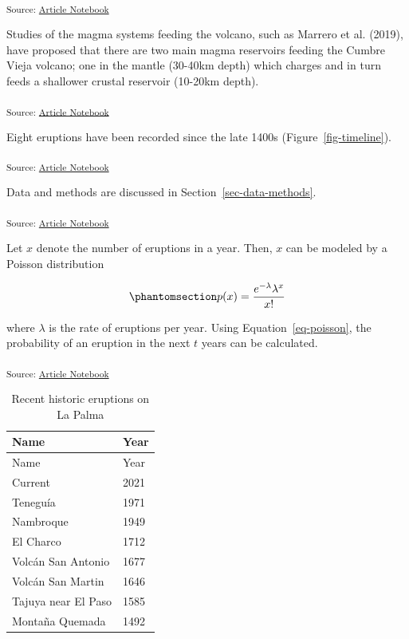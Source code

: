 \documentclass[
]{agujournal2019}
\begin{document}
\textsubscript{Source:
\href{https://umbertomig.github.io/quarto-learning/index.ipynb.html}{Article
Notebook}}

Studies of the magma systems feeding the volcano, such as Marrero et al.
(2019), have proposed that there are two main magma reservoirs feeding
the Cumbre Vieja volcano; one in the mantle (30-40km depth) which
charges and in turn feeds a shallower crustal reservoir (10-20km depth).

\textsubscript{Source:
\href{https://umbertomig.github.io/quarto-learning/index.ipynb.html}{Article
Notebook}}

Eight eruptions have been recorded since the late 1400s
(Figure~\ref{fig-timeline}).

\textsubscript{Source:
\href{https://umbertomig.github.io/quarto-learning/index.ipynb.html}{Article
Notebook}}

Data and methods are discussed in Section~\ref{sec-data-methods}.

\textsubscript{Source:
\href{https://umbertomig.github.io/quarto-learning/index.ipynb.html}{Article
Notebook}}

Let \(x\) denote the number of eruptions in a year. Then, \(x\) can be
modeled by a Poisson distribution

\begin{equation}\phantomsection\label{eq-poisson}{
p(x) = \frac{e^{-\lambda} \lambda^{x}}{x !}
}\end{equation}

where \(\lambda\) is the rate of eruptions per year. Using
Equation~\ref{eq-poisson}, the probability of an eruption in the next
\(t\) years can be calculated.

\textsubscript{Source:
\href{https://umbertomig.github.io/quarto-learning/index.ipynb.html}{Article
Notebook}}

\begin{longtable}[]{@{}ll@{}}
\caption{Recent historic eruptions on La
Palma}\label{tbl-history}\tabularnewline
\toprule\noalign{}
Name & Year \\
\midrule\noalign{}
\endfirsthead
\toprule\noalign{}
Name & Year \\
\midrule\noalign{}
\endhead
\bottomrule\noalign{}
\endlastfoot
Current & 2021 \\
Teneguía & 1971 \\
Nambroque & 1949 \\
El Charco & 1712 \\
Volcán San Antonio & 1677 \\
Volcán San Martin & 1646 \\
Tajuya near El Paso & 1585 \\
Montaña Quemada & 1492 \\
\end{longtable}
\end{document}
